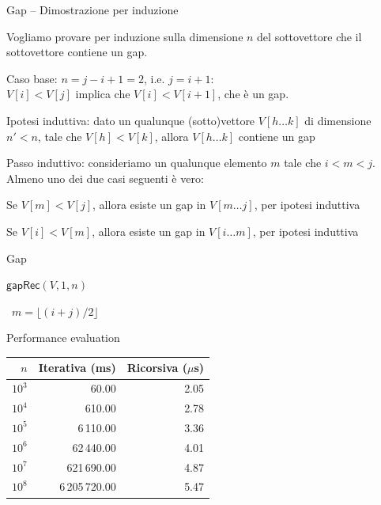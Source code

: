 \begin{frame}{Gap -- Dimostrazione per induzione}

Vogliamo provare per induzione sulla dimensione $n$ del sottovettore che 
il sottovettore contiene un gap.
\BIL
\item \alert{Caso base}: $n=j-i+1=2$, i.e. $j = i+1$: \\
$V[i]<V[j]$ implica che $V[i] < V[i+1]$, che è un gap.
\item \alert{Ipotesi induttiva}: dato un qualunque (sotto)vettore $V[h \ldots k]$ di 
dimensione $n'<n$, tale che $V[h] < V[k]$, allora $V[h \ldots k]$ contiene un gap
\item \alert{Passo induttivo}: consideriamo un qualunque elemento
$m$ tale che $i<m<j$. Almeno uno dei due casi seguenti è vero:
\BI
\item Se $V[m] < V[j]$, allora esiste un gap in $V[m \ldots j]$, per ipotesi
induttiva
\item Se $V[i] < V[m]$, allora esiste un gap in $V[i \ldots m]$, per ipotesi
induttiva
\EI
\EIL

\end{frame}

\begin{frame}{Gap}

\vspace{-9pt}
\begin{Procedure}
\caption[A]{\INTEGER\ \textsf{gap}($\INTEGER[\,]\ V$, \INTEGER $n$)}
  \Return $\textsf{gapRec}(V, 1, n)$\;
\end{Procedure}

\begin{Procedure}
\caption[A]{\INTEGER\ \textsf{gapRec}($\INTEGER[\,]\ V$, \INTEGER $i$, \INTEGER $j$)}
\INTEGER\ $m = \lfloor (i+j)/2 \rfloor$\;

\end{Procedure}


\end{frame}

\begin{frame}{Performance evaluation}

\vspace{-9pt}
\begin{center}
\begin{tabular}{|r|r|r|}
\hline
$n$ & \textbf{Iterativa (ms)} & \textbf{Ricorsiva (${\mu}$s)}\\\hline
$10^3$ & 60.00 & 2.05\\\hline
$10^4$ & 610.00 & 2.78\\\hline
$10^5$ & 6\,110.00 & 3.36\\\hline
$10^6$ & 62\,440.00 & 4.01\\\hline
$10^7$ & 621\,690.00 & 4.87\\\hline
$10^8$ & 6\,205\,720.00 & 5.47\\\hline
\end{tabular}
\end{center}

\end{frame}








\begin{frame}{}

\end{frame}
